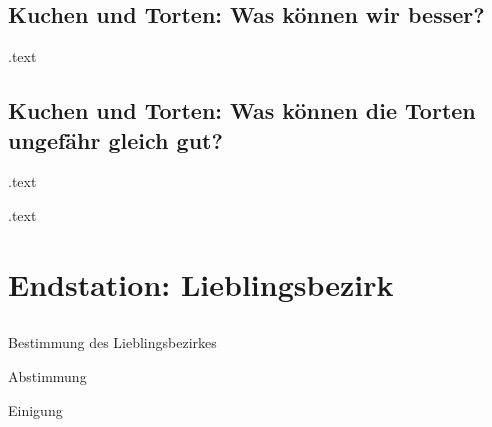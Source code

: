 \documentclass[pdf]{beamer}
\begin{document}
		\subsection{Kuchen und Torten: Was können wir besser?}
			\begin{frame}
			.text
			\end{frame}
		\subsection{Kuchen und Torten: Was können die Torten ungefähr gleich gut?}
			\begin{frame}
			.text
			\end{frame}
			\begin{frame}
			.text
			\end{frame}
	\section{Endstation: Lieblingsbezirk}
	\subsection*{}
		\begin{frame}
		\centering
		Bestimmung des Lieblingsbezirkes
		\end{frame}
		\begin{frame}
		\centering
		\Large{Abstimmung}
		\end{frame}
		\begin{frame}
		\centering
		\Large{Einigung}
		\end{frame}
\end{document}
